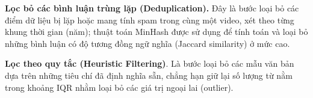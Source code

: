 \textbf{Lọc bỏ các bình luận trùng lặp (Deduplication).} Đây là bước loại bỏ các điểm dữ liệu bị lặp hoặc mang tính spam trong cùng một video, xét theo từng khung thời gian (năm); thuật toán MinHash \parencite{broder1998min} được sử dụng để tính toán và loại bỏ những bình luận có độ tương đồng ngữ nghĩa (Jaccard similarity) ở mức cao.

\textbf{Lọc theo quy tắc (Heuristic Filtering)}. Là bước loại bỏ các mẫu văn bản dựa trên những tiêu chí đã định nghĩa sẵn, chẳng hạn giữ lại số lượng từ nằm trong khoảng IQR nhằm loại bỏ các giá trị ngoại lai (outlier).

